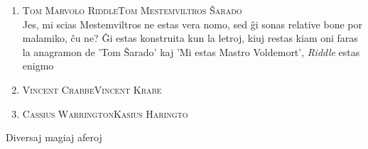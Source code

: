 \begin{enumerate}
\item\label{nomoj:ŝarado} \textsc{Tom Marvolo Riddle}\dotfill \textsc{Tom Mestemviltros Ŝarado}\\
{\footnotesize \indent Jes, mi scias Mestemviltros ne estas vera nomo,
  sed ĝi sonas relative bone por malamiko, ĉu ne? Ĝi estas konstruita
  kun la letroj, kiuj restas kiam oni faras la anagramon de 'Tom
  Ŝarado' kaj 'Mi estas Mastro Voldemort', \emph{Riddle} estas enigmo}
\smallskip

\item\label{nomoj:krabe} \textsc{Vincent Crabbe}\dotfill \textsc{Vincent Krabe}\\
\item \textsc{Cassius Warrington}\dotfill \textsc{Kasius Haringto}\\

\end{enumerate}

\begin{center}
  {\hpfont \large Diversaj magiaj aferoj}
\end{center}

